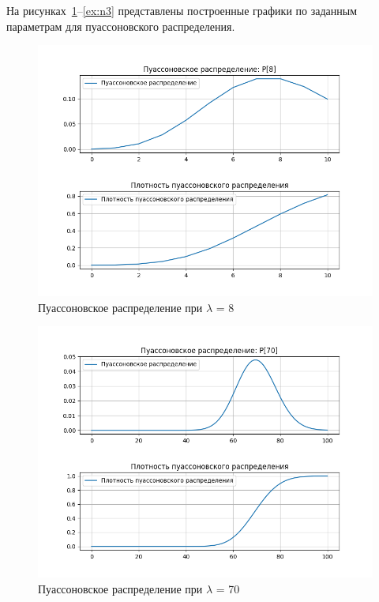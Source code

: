 \clearpage

На рисунках~\ref{ex:n1}--\ref{ex:n3} представлены построенные графики по заданным параметрам для пуассоновского распределения.

\begin{figure}[ht!]
	\centering
	\includegraphics[width=1.0\linewidth]{img/poisson1.png}
	\caption{Пуассоновское распределение при $\lambda$ = 8}
	\label{ex:n1}
\end{figure}

\clearpage

\begin{figure}[ht!]
	\centering
	\includegraphics[width=1.0\linewidth]{img/poisson2.png}
	\caption{Пуассоновское распределение при $\lambda$ = 70}
	\label{ex:n2}
\end{figure}

